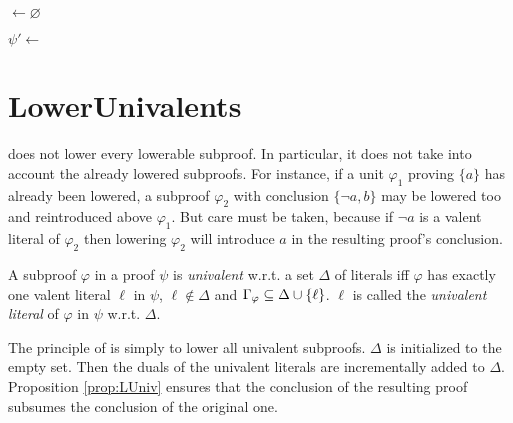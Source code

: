 \documentclass{llncs}
\begin{document}
\begin{algorithm}[bt]
  \BlankLine

  \Units $\leftarrow \varnothing$ \;
  \BlankLine

  \BlankLine

  $\psi' \leftarrow $ \Rec{$\psi$,$\Units$} \;
  \BlankLine


  \caption{\LowerUnits}
  \label{algo:LU}
\end{algorithm}




\section{LowerUnivalents} \label{sec:LUniv}

{\LowerUnits} does not lower every lowerable subproof. In particular, it does not take into
account the already lowered subproofs. For instance, if a unit $\varphi_1$ proving $\{a\}$ has
already been lowered, a subproof $\varphi_2$ with conclusion $\{\neg a,b\}$ may be lowered too and
reintroduced above $\varphi_1$. But care must be taken, because if $\neg a$ is a valent literal of
$\varphi_2$ then lowering $\varphi_2$ will introduce $a$ in the resulting proof's conclusion.

\begin{definition}
A subproof $\varphi$ in a proof $\psi$ is \emph{univalent} w.r.t. a set $\Delta$ of literals iff
$\varphi$ has exactly one valent literal $\ell$ in $\psi$, $\ell \notin \Delta$ and
$\Gamma_{\varphi} \subseteq \Delta \cup \left\{ \ell \right\}$. $\ell$ is called the \emph{univalent
literal} of $\varphi$ in $\psi$ w.r.t.  $\Delta$.
\end{definition}

The principle of {\LowerUnivalents} is simply to lower all univalent subproofs. $\Delta$ is
initialized to the empty set. Then the duals of the univalent literals are incrementally added to
$\Delta$. Proposition \ref{prop:LUniv} ensures that the conclusion of the resulting proof
subsumes the conclusion of the original one.
\end{document}
